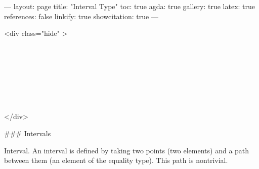 ---
layout: page
title: "Interval Type"
toc: true
agda: true
gallery: true
latex: true
references: false
linkify: true
showcitation: true
---

<div class="hide" >
\begin{code}%
\>[0]\AgdaSymbol{\{-\#}\AgdaSpace{}%
\AgdaSpace{}%
\AgdaSpace{}%
\AgdaSymbol{\#-\}}\<%
\\
\>[0]\AgdaSpace{}%
\AgdaSpace{}%
\<%
\\
\>[0]\AgdaSpace{}%
\AgdaSpace{}%
\<%
\\
%
\\[\AgdaEmptyExtraSkip]%
\>[0]\AgdaSpace{}%
\AgdaSpace{}%
\<%
\\
\>[0]\AgdaSpace{}%
\AgdaSpace{}%
\<%
\\
\>[0]\AgdaSpace{}%
\AgdaSpace{}%
\<%
\end{code}
</div>

### Intervals

Interval. An interval is defined by taking two points (two elements) and a path
between them (an element of the equality type). This path is nontrivial.

